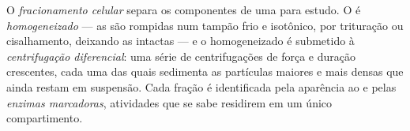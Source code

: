 \begin{definition}\label{def:b1:cell-unit-of-life:fractionation}
O \emph{fracionamento celular} separa os
componentes de uma  para estudo. O  é
\emph{homogeneizado} --- as  são rompidas
num tampão frio e isotônico, por trituração ou cisalhamento, deixando as
 intactas --- e o homogeneizado é submetido à
\emph{centrifugação diferencial}: uma
série de centrifugações de força e duração crescentes, cada uma das
quais sedimenta as partículas maiores e mais densas que ainda restam em
suspensão. Cada fração é identificada pela aparência ao  e pelas \emph{enzimas marcadoras},
atividades que se sabe residirem em um único compartimento.
\end{definition}

